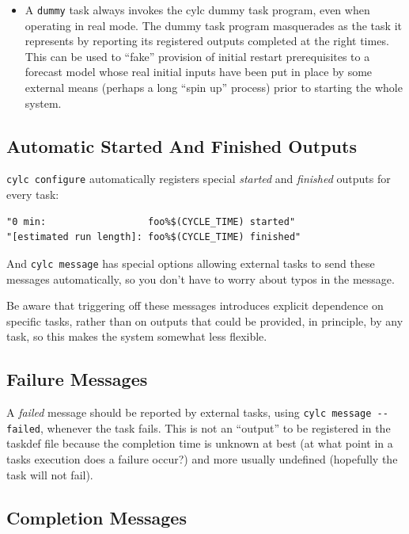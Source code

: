 \documentclass[11pt,a4paper]{article}
\begin{document}
\begin{itemize}
    \item A \lstinline=dummy= task always invokes the cylc dummy task
        program, even when operating in real mode.  The dummy task
        program masquerades as the task it represents by reporting its
        registered outputs completed at the right times. This can be
        used to ``fake'' provision of initial restart prerequisites to a
        forecast model whose real initial inputs have been put in place
        by some external means (perhaps a long ``spin up'' process)
        prior to starting the whole system.

\end{itemize}



\subsection{Automatic Started And Finished Outputs}

\lstinline=cylc configure= automatically registers special {\em started}
and {\em finished} outputs for every task: 

\begin{lstlisting}
"0 min:                  foo%$(CYCLE_TIME) started"
"[estimated run length]: foo%$(CYCLE_TIME) finished"
\end{lstlisting}

And \lstinline=cylc message= has special options allowing external
tasks to send these messages automatically, so you don't have to worry
about typos in the message.

Be aware that triggering off these messages introduces explicit
dependence on specific tasks, rather than on outputs that could be
provided, in principle, by any task, so this makes the system somewhat
less flexible.


\subsection{Failure Messages}

A {\em failed} message should be reported by external tasks, using 
\lstinline=cylc message --failed=, whenever the task fails. This is 
not an ``output'' to be registered in the taskdef file because the
completion time is unknown at best (at what point in a tasks execution
does a failure occur?) and more usually undefined (hopefully the task
will not fail). 

\subsection{Completion Messages}
\end{document}
